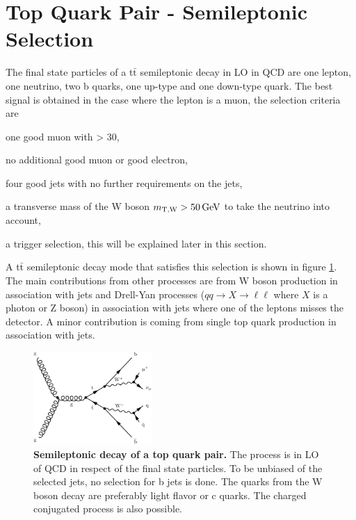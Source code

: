 \section{Top Quark Pair - Semileptonic Selection} \label{sec:ch_6_semilep}
The final state particles of a t$\bar{\textrm{t}}$ semileptonic decay in LO in QCD are one lepton, one neutrino, two b quarks, one up-type and one down-type quark. The best signal is obtained in the case where the lepton is a muon, the selection criteria are
\begin{description}
\setlength{\itemsep}{-20pt}
\item[•] one good muon with \pt > 30,\\
\item[•] no additional good muon or good electron,\\
\item[•] four good jets with no further requirements on the jets,\\
\item[•] a transverse mass of the W boson $m_{\textrm{T,W}} > 50\,\mathrm{GeV}$ to take the neutrino into account,\\
\item[•] a trigger selection, this will be explained later in this section.
\end{description}
A t$\bar{\textrm{t}}$ semileptonic decay mode that satisfies this selection is shown in figure \ref{fig:ch_6_semilep_mu}. The main contributions from other processes are from W boson production in association with jets and Drell-Yan processes ($qq \rightarrow X \rightarrow \ell\ell$ where $X$ is a photon or Z boson) in association with jets where one of the leptons misses the detector. A minor contribution is coming from single top quark production in association with jets. 

\begin{figure}
\centering
\includegraphics[width=0.4\textwidth]{assets/Feynman/semilep_mu_tt.pdf}
\caption[Semileptonic Decay of a Top Quark Pair]{\textbf{Semileptonic decay of a top quark pair.} The process is in LO of QCD in respect of the final state particles. To be unbiased of the selected jets, no selection for b jets is done. The quarks from the W boson decay are preferably light flavor or c quarks. The charged conjugated process is also possible.}
\label{fig:ch_6_semilep_mu}
\end{figure}

